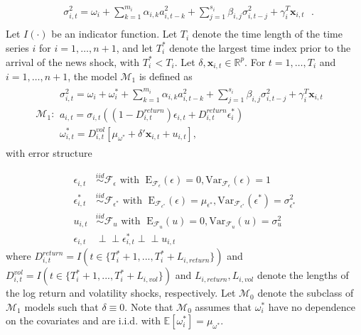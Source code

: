 \documentclass[11pt]{article}
\newcommand{\x}{\textbf{x}}
\def\mbf#1{\mathbf{#1}} %
\newcommand{\simiid}{\stackrel{iid}{\sim}} %
\newcommand{\indep}{\perp \!\!\! \perp } %
\def\mrm#1{\mathrm{#1}} %
\def\mc#1{\mathcal{#1}} %
\def\E{\mathbb{E}} %
\def\mc#1{\mathcal{#1}}
\theoremstyle{definition}
\begin{document}
\begin{align*}
&\sigma_{i,t}^{2} = \omega_{i} + \sum^{m_{i}}_{k=1}\alpha_{i,k}a^{2}_{i,t-k} + \sum_{j=1}^{s_{i}}\beta_{i,j}\sigma_{i,t-j}^{2} + \gamma_{i}^{T} \x_{i,t} \text{ }. \\
\end{align*}
Let $I(\cdot)$ be an indicator function.  Let $T_i$ denote the time length of the time series $i$ for $i = 1, \ldots, n+1$, and let $T_i^*$ denote the largest time index prior to the arrival of the news shock, with $T_i^* < T_i$.  Let $\delta, \x_{i,t} \in \mathbb{R}^{p}$.  For $t= 1, \ldots, T_i$ and $i = 1, \ldots, n+1$, the model $\mc{M}_1$ is defined as 
\begin{align*}
  \mc{M}_1 \colon \begin{array}{l}
     \sigma^{2}_{i,t} = \omega_{i} + \omega^{*}_i + \sum^{m_{i}}_{k=1}\alpha_{i,k}a^{2}_{i,t-k} + \sum_{j=1}^{s_{i}}\beta_{i,j}\sigma_{i,t-j}^{2} + \gamma_{i}^{T} \x_{i,t} \text{ }\\[.2cm]
     a_{i,t} = \sigma_{i,t}((1-D^{return}_{i,t})\epsilon_{i,t} + D^{return}_{i,t}\epsilon^{*}_{i})\\[.2cm]
    \omega_{i,t}^{*} = D^{vol}_{i,t}[\mu_{\omega^{*}}+\delta'\mbf{x}_{i, t}+ u_{i,t}],
  \end{array}
  \end{align*}
with error structure

  \begin{align*}
    \epsilon_{i,t} &\simiid \mc{F}_{\epsilon} \text{ with }  \; \mrm{E}_{\mc{F}_{\epsilon}}(\epsilon) = 0, \mrm{Var}_{\mc{F}_{\epsilon}}(\epsilon)  = 1  \\
    \epsilon^{*}_{i,t} &\simiid \mc{F}_{\epsilon^{*}} \text{ with }  \; \mrm{E}_{\mc{F}_{\epsilon^{*}}}(\epsilon) = \mu_{\epsilon^{*}}, \mrm{Var}_{\mc{F}_{\epsilon^{*}}}(\epsilon^{*})  = \sigma^2_{\epsilon^{*}}  \\
    u_{i,t} & \simiid  \mc{F}_{u} \text{ with }  \; \mrm{E}_{\mc{F}_{u}}(u) = 0, \mrm{Var}_{\mc{F}_{u}}(u) = \sigma^2_{u}\\
    \epsilon_{i,t} & \indep  \epsilon^{*}_{i,t}  \indep u_{i,t}
    \end{align*}
where $D^{return}_{i,t} = I(t \in \{T_i^* + 1,...,T_i^* + L_{i, return}\})$ and $D^{vol}_{i,t} = I(t \in \{T_i^* + 1,...,T_i^* + L_{i, vol}\})$ and $L_{i,return},L_{i,vol}$ denote the lengths of the log return and volatility shocks, respectively.  Let $\mc{M}_{0}$ denote the subclass of $\mc{M}_{1}$ models such that $\delta \equiv 0$.  Note that $\mc{M}_{0}$ assumes that $\omega^{*}_i$ have no dependence on the covariates and are i.i.d. with $\E[ \omega^{*}_i]=\mu_{\omega^{*}}$.  
\end{document}
